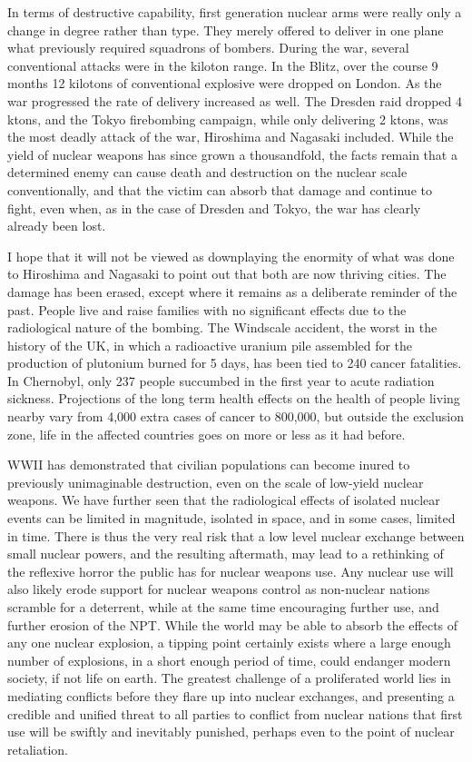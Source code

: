 \documentclass[journal]{IEEEtran}
\begin{document}
In terms of destructive capability, first generation nuclear arms were really only a change in degree rather than type.  They merely offered to deliver in one plane what previously required squadrons of bombers.  During the war, several conventional attacks were in the kiloton range.  In the Blitz, over the course 9 months 12 kilotons of conventional explosive were dropped on London.  As the war progressed the rate of delivery increased as well.  The Dresden raid dropped 4 ktons, and the Tokyo firebombing campaign, while only delivering 2 ktons, was the most deadly attack of the war, Hiroshima and Nagasaki included.  While the yield of nuclear weapons has since grown a thousandfold, the facts remain that a determined enemy can cause death and destruction on the nuclear scale conventionally, and that the victim can absorb that damage and continue to fight, even when, as in the case of Dresden and Tokyo, the war has clearly already been lost.\par
I hope that it will not be viewed as downplaying the enormity of what was done to Hiroshima and Nagasaki to point out that both are now thriving cities.  The damage has been erased, except where it remains as a deliberate reminder of the past.  People live and raise families with no significant effects due to the radiological nature of the bombing.  The Windscale accident, the worst in the history of the UK, in which a radioactive uranium pile assembled for the production of plutonium burned for 5 days, has been tied to 240 cancer fatalities.  In Chernobyl, only 237 people succumbed in the first year to acute radiation sickness.  Projections of the long term health effects on the health of people living nearby vary from 4,000 extra cases of cancer to 800,000, but outside the exclusion zone, life in the affected countries goes on more or less as it had before.\par
WWII has demonstrated that civilian populations can become inured to previously unimaginable destruction, even on the scale of low-yield nuclear weapons.  We have further seen that the radiological effects of isolated nuclear events can be limited in magnitude, isolated in space, and in some cases, limited in time.  There is thus the very real risk that a low level nuclear exchange between small nuclear powers, and the resulting aftermath, may lead to a rethinking of the reflexive horror the public has for nuclear weapons use.  Any nuclear use will also likely erode support for nuclear weapons control as non-nuclear nations scramble for a deterrent, while at the same time encouraging further use, and further erosion of the NPT.  While the world may be able to absorb the effects of any one nuclear explosion, a tipping point certainly exists where a large enough number of explosions, in a short enough period of time, could endanger modern society, if not life on earth. The greatest challenge of a proliferated world lies in mediating conflicts before they flare up into nuclear exchanges, and presenting a credible and unified threat to all parties to conflict from nuclear nations that first use will be swiftly and inevitably punished, perhaps even to the point of nuclear retaliation.
\end{document}
